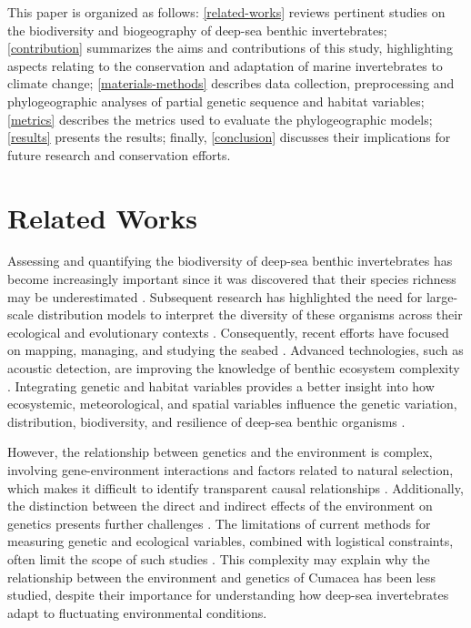 This paper is organized as follows: \autoref{related-works} reviews pertinent studies on the biodiversity and biogeography of deep-sea benthic invertebrates; \autoref{contribution} summarizes the aims and contributions of this study, highlighting aspects relating to the conservation and adaptation of marine invertebrates to climate change; \autoref{materials-methods} describes data collection, preprocessing and phylogeographic analyses of partial genetic sequence and habitat variables; \autoref{metrics} describes the metrics used to evaluate the phylogeographic models; \autoref{results} presents the results; finally, \autoref{conclusion} discusses their implications for future research and conservation efforts.

\section{Related Works}\label{related-works}
Assessing and quantifying the biodiversity of deep-sea benthic invertebrates has become increasingly important since it was discovered that their species richness may be underestimated \citep{grassle1992deep}. Subsequent research has highlighted the need for large-scale distribution models to interpret the diversity of these organisms across their ecological and evolutionary contexts \citep{rex1997large}. Consequently, recent efforts have focused on mapping, managing, and studying the seabed \citep{brown2011benthic}. Advanced technologies, such as acoustic detection, are improving the knowledge of benthic ecosystem complexity \citep{brown2011benthic}. Integrating genetic and habitat variables provides a better insight into how ecosystemic, meteorological, and spatial variables influence the genetic variation, distribution, biodiversity, and resilience of deep-sea benthic organisms \citep{vrijenhoek2009cryptic}.

However, the relationship between genetics and the environment is complex, involving gene-environment interactions and factors related to natural selection, which makes it difficult to identify transparent causal relationships \citep{balkenhol_identifying_2009}. Additionally, the distinction between the direct and indirect effects of the environment on genetics presents further challenges \citep{manel_perspectives_2010, balkenhol_landscape_2019}. The limitations of current methods for measuring genetic and ecological variables, combined with logistical constraints, often limit the scope of such studies \citep{manel_perspectives_2010, shafer_widespread_2013}. This complexity may explain why the relationship between the environment and genetics of Cumacea has been less studied, despite their importance for understanding how deep-sea invertebrates adapt to fluctuating environmental conditions.

